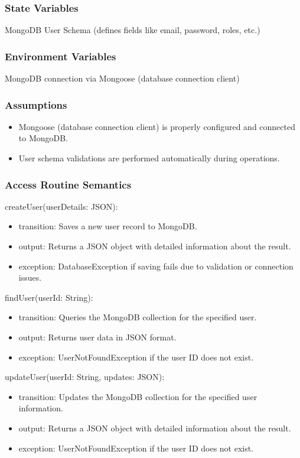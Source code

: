 \documentclass[12pt, titlepage]{article}
\begin{document}
\subsubsection{State Variables}
MongoDB User Schema (defines fields like email, password, roles, etc.)

\subsubsection{Environment Variables}
MongoDB connection via Mongoose (database connection client)

\subsubsection{Assumptions}
\begin{itemize}
  \item Mongoose (database connection client) is properly configured and connected to MongoDB.
  \item User schema validations are performed automatically during operations.
\end{itemize}

\subsubsection{Access Routine Semantics}

\noindent createUser(userDetails: JSON):
\begin{itemize}
  \item transition: Saves a new user record to MongoDB.
  \item output: Returns a JSON object with detailed information about the result.
  \item exception: DatabaseException if saving fails due to validation or connection issues.
\end{itemize}

\noindent findUser(userId: String):
\begin{itemize}
  \item transition: Queries the MongoDB collection for the specified user.
  \item output: Returns user data in JSON format.
  \item exception: UserNotFoundException if the user ID does not exist.
\end{itemize}

\noindent updateUser(userId: String, updates: JSON):
\begin{itemize}
  \item transition: Updates the MongoDB collection for the specified user information.
  \item output: Returns a JSON object with detailed information about the result.
  \item exception: UserNotFoundException if the user ID does not exist.
\end{itemize}
\end{document}
